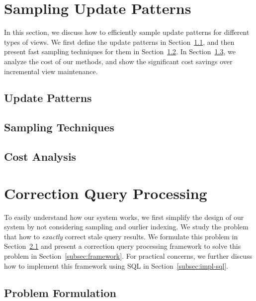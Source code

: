 \section{Sampling Update Patterns}
In this section, we discuss how to efficiently sample update patterns for different types of views.
We first define the update patterns in Section~\ref{subsec:pattern}, and then present fast sampling techniques for them in Section~\ref{subsec:sample-pattern}. In Section~\ref{subsec:sample-pattern-cost}, we analyze the cost of our methods, and show the significant cost savings over incremental view maintenance.

\subsection{Update Patterns}\label{subsec:pattern}


\subsection{Sampling Techniques}\label{subsec:sample-pattern}



\subsection{Cost Analysis}\label{subsec:sample-pattern-cost}



\iffalse
\section{Correction Query Processing} \label{sec:exact-correct}
To easily understand how our system works, we first simplify the design of our system by not considering sampling and ourlier indexing. We study the problem that how to \emph{exactly} correct stale query results. We formulate this problem in Section~\ref{subsec:formulation} and present a correction query processing framework to solve this problem in Section~\ref{subsec:framework}. For practical concerns, we further discuss how to implement this framework using SQL in Section~\ref{subsec:impl-sql}.

\subsection{Problem Formulation}\label{subsec:formulation}



